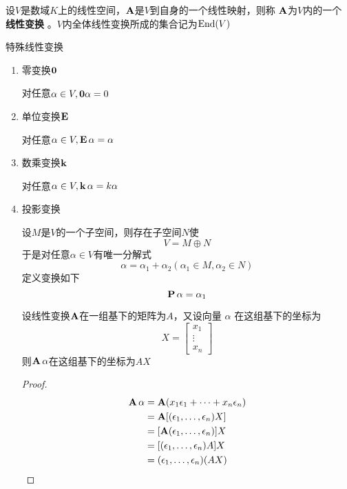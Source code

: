 \documentclass[11pt]{article}
\begin{document}
\begin{definition}[]
设\(V\)是数域\(K\)上的线性空间，\(\operatorname{\textbf{A}}\)是\(V\)到自身的一个线性映射，则称
\(\operatorname{\textbf{A}}\)为\(V\)内的一个 \textbf{线性变换} 。\(V\)内全体线性变换所成的集合记为\(\operatorname{End}(V)\)
\end{definition}

特殊线性变换
\begin{enumerate}
\item 零变换\(\mathbf{0}\)

对任意\(\alpha\in V,\mathbf{0}\alpha=0\)

\item 单位变换\(\operatorname{\textbf{E}}\)

对任意\(\alpha\in V,\operatorname{\textbf{E}}\alpha=\alpha\)

\item 数乘变换\(\operatorname{\textbf{k}}\)

对任意\(\alpha\in V,\operatorname{\textbf{k}}\alpha=k\alpha\)

\item 投影变换

设\(M\)是\(V\)的一个子空间，则存在子空间\(N\)使
\begin{equation*}
V=M\oplus N
\end{equation*}
于是对任意\(\alpha\in V\)有唯一分解式
\begin{equation*}
\alpha=\alpha_1+\alpha_2(\alpha_1\in M,\alpha_2\in N)
\end{equation*}
定义变换如下
\begin{equation*}
\operatorname{\textbf{P}}\alpha=\alpha_1
\end{equation*}

\begin{proposition}[]
\label{prop4.3.8}
设线性变换\(\operatorname{\textbf{A}}\)在一组基下的矩阵为\(A\)，又设向量 \(\alpha\) 在这组基下的坐标为
\begin{equation*}
X=
\begin{bmatrix}
x_1\\\vdots\\x_n
\end{bmatrix}
\end{equation*}
则\(\operatorname{\textbf{A}}\alpha\)在这组基下的坐标为\(AX\)
\end{proposition}

\begin{proof}
\begin{align*}
\operatorname{\textbf{A}}\alpha&=\operatorname{\textbf{A}}(x_1\epsilon_1+\dots+x_n\epsilon_n)\\
&=\operatorname{\textbf{A}}[(\epsilon_1,\dots,\epsilon_n)X]\\
&=[\operatorname{\textbf{A}}(\epsilon_1,\dots,\epsilon_n)]X\\
&=[(\epsilon_1,\dots,\epsilon_n)A]X\\
&=(\epsilon_1,\dots,\epsilon_n)(AX)
\end{align*}
\end{proof}


\end{enumerate}
\end{document}
